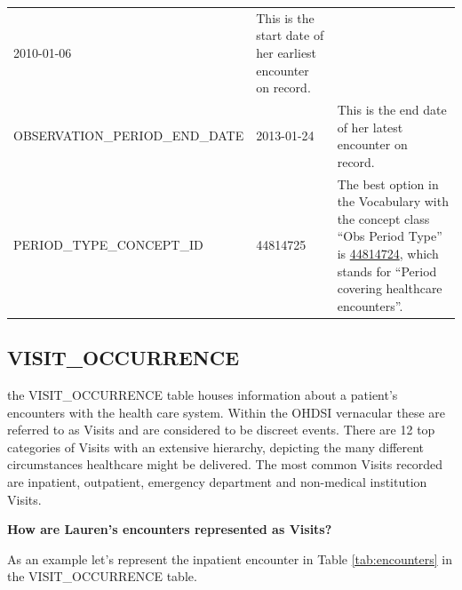 \documentclass[11pt]{book}
\theoremstyle{definition}
\theoremstyle{definition}
\theoremstyle{definition}
\theoremstyle{remark}
\begin{document}
\begin{longtable}[]{@{}lll@{}}
\begin{minipage}[t]{0.15\columnwidth}
2010-01-06\strut
\end{minipage} & \begin{minipage}[t]{0.49\columnwidth}\raggedright
This is the start date of her earliest encounter on record.\strut
\end{minipage}\tabularnewline
\begin{minipage}[t]{0.28\columnwidth}\raggedright
OBSERVATION\_PERIOD\_END\_DATE\strut
\end{minipage} & \begin{minipage}[t]{0.15\columnwidth}\raggedright
2013-01-24\strut
\end{minipage} & \begin{minipage}[t]{0.49\columnwidth}\raggedright
This is the end date of her latest encounter on record.\strut
\end{minipage}\tabularnewline
\begin{minipage}[t]{0.28\columnwidth}\raggedright
PERIOD\_TYPE\_CONCEPT\_ID\strut
\end{minipage} & \begin{minipage}[t]{0.15\columnwidth}\raggedright
44814725\strut
\end{minipage} & \begin{minipage}[t]{0.49\columnwidth}\raggedright
The best option in the Vocabulary with the concept class ``Obs Period Type'' is \href{http://athena.ohdsi.org/search-terms/terms/44814724}{44814724}, which stands for ``Period covering healthcare encounters''.\strut
\end{minipage}\tabularnewline
\bottomrule
\end{longtable}

\hypertarget{visitOccurrence}{%
\subsection{VISIT\_OCCURRENCE}\label{visitOccurrence}}

the VISIT\_OCCURRENCE table houses information about a patient's encounters with the health care system. Within the OHDSI vernacular these are referred to as Visits and are considered to be discreet events. There are 12 top categories of Visits with an extensive hierarchy, depicting the many different circumstances healthcare might be delivered. The most common Visits recorded are inpatient, outpatient, emergency department and non-medical institution Visits.

\textbf{How are Lauren's encounters represented as Visits?}

As an example let's represent the inpatient encounter in Table \ref{tab:encounters} in the VISIT\_OCCURRENCE table.
\end{document}
